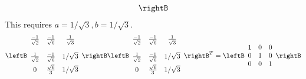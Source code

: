 \begin{enumialphparenastyle}
\begin{ex}
\begin{sol}
\begin{eqnarray*}
\begin{array}{ccc}
\end{array}
\rightB
\end{eqnarray*}
This requires $a=1/\sqrt{3},b=1/\sqrt{3}$.
\[
\leftB
\begin{array}{ccc}
\vspace{0.05in}\frac{-1}{\sqrt{2}} & \vspace{0.05in}\frac{-1}{\sqrt{6}} &
\vspace{0.05in}\frac{1}{\sqrt{3}} \\
\vspace{0.05in}\frac{1}{\sqrt{2}} & \frac{-1}{\sqrt{6}} & 1/\sqrt{3} \\
0 & \vspace{0.05in}\frac{\sqrt{6}}{3} & 1/\sqrt{3}
\end{array}
\rightB \leftB
\begin{array}{ccc}
\vspace{0.05in}\frac{-1}{\sqrt{2}} & \vspace{0.05in}\frac{-1}{\sqrt{6}} &
\vspace{0.05in}\frac{1}{\sqrt{3}} \\
\vspace{0.05in}\frac{1}{\sqrt{2}} & \frac{-1}{\sqrt{6}} & 1/\sqrt{3} \\
0 & \vspace{0.05in}\frac{\sqrt{6}}{3} & 1/\sqrt{3}
\end{array}
\rightB ^{T}= \leftB
\begin{array}{ccc}
1 & 0 & 0 \\
0 & 1 & 0 \\
0 & 0 & 1
\end{array}
\rightB
\]
\end{sol}
\end{ex}


\end{enumialphparenastyle}
